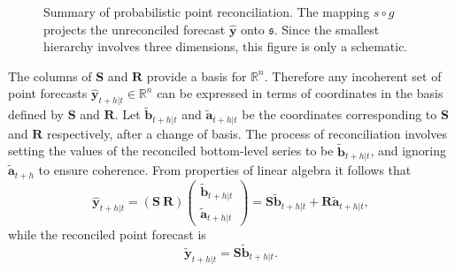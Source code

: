 \documentclass[12pt]{article}
\theoremstyle{definition}
\begin{document}
%


\begin{figure}
	
	\caption{Summary of probabilistic point reconciliation. The mapping $s\circ g$ projects the unreconciled forecast $\hat{\bm{y}}$ onto $\mathfrak{s}$. Since the smallest hierarchy involves three dimensions, this figure is only a schematic.}\label{fig:pointfr_sch}
\end{figure}

The columns of $\bm{S}$ and $\bm{R}$ provide a basis for $\mathbb{R}^n$. Therefore any incoherent set of point forecasts $\hat{\bm{y}}_{t+h|t} \in \mathbb{R}^n$ can be expressed in terms of coordinates in the basis defined by $\bm{S}$ and $\bm{R}$. Let $\tilde{\bm{b}}_{t+h|t}$ and $\tilde{\bm{a}}_{t+h|t}$ be the coordinates corresponding to $\bm{S}$ and $\bm{R}$ respectively, after a change of basis. The process of reconciliation involves setting the values of the reconciled bottom-level series to be $\tilde{\bm{b}}_{t+h|t}$, and ignoring $\tilde{\bm{a}}_{t+h}$ to ensure coherence. From properties of linear algebra it follows that
\[
  \hat{\bm{y}}_{t+h|t} = (\bm{S} ~ \bm{R})
  \begin{pmatrix}
  \tilde{\bm{b}}_{t+h|t}\\ \tilde{\bm{a}}_{t+h|t}
  \end{pmatrix}= \bm{S}\tilde{\bm{b}}_{t+h|t} + \bm{R}\tilde{\bm{a}}_{t+h|t},
\]
while the reconciled point forecast is
\[
  \tilde{\bm{y}}_{t+h|t} = \bm{S}\tilde{\bm{b}}_{t+h|t}.
\]
\end{document}

